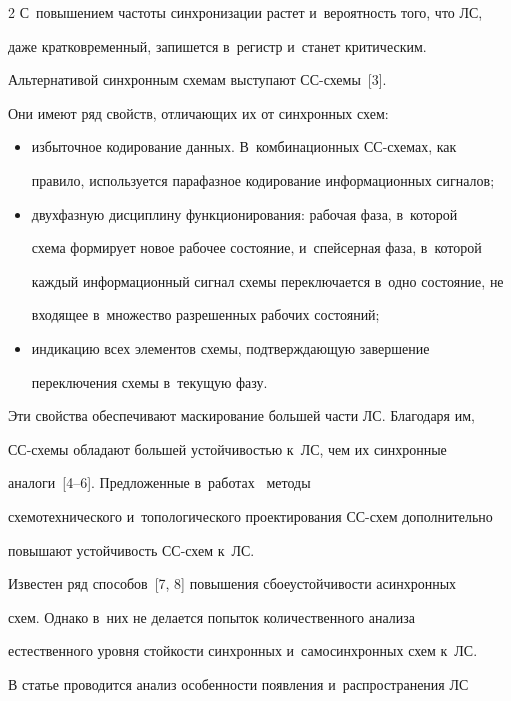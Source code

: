 \begin{multicols}{2}
С~повышением частоты синхронизации растет и~вероятность того, что ЛС, 

даже кратковременный, запишется в~регистр и~станет критическим.

  

  Альтернативой синхронным схемам выступают СС-схе\-мы~[3]. 

  Они имеют ряд свойств, отличающих их от синхронных схем:

  \begin{itemize}

\item избыточное кодирование данных. В~комбинационных СС-схе\-мах, как 

правило, используется парафазное кодирование информационных сигналов;

\item двухфазную дисциплину функционирования: рабочая фаза, в~которой 

схема формирует новое рабочее состояние, и~спейсерная фаза, в~которой 

каждый информационный сигнал схемы переключается в~одно состояние, не 

входящее в~множество разрешенных рабочих состояний;

\item индикацию всех элементов схемы, подтверждающую завершение 

переключения схемы в~текущую фазу.

\end{itemize}



  Эти свойства обеспечивают маскирование большей части ЛС. Благодаря им, 

СС-схемы обладают большей устойчивостью к~ЛС, чем их синхронные 

аналоги~[4--6]. Предложенные в~работах~\cite{4-sok, 5-sok} методы 

схемотехнического и~топологического проектирования СС-схем дополнительно 

повышают устойчивость СС-схем к~ЛС.

  

  Известен ряд способов~[7, 8] повышения сбоеустойчивости асинхронных 

схем. Однако в~них не делается попыток количественного анализа 

естественного уровня стойкости синхронных и~самосинхронных схем к~ЛС.

  

  В статье проводится анализ особенности появления и~распространения ЛС 


\end{multicols}

